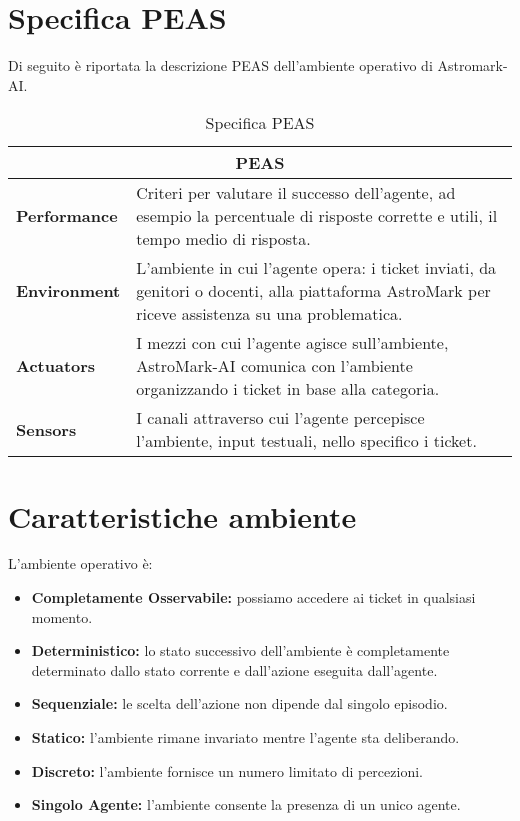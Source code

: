\section{Specifica PEAS}
Di seguito è riportata la descrizione PEAS dell'ambiente operativo di Astromark-AI.
\begin{table}[h]
\centering
\begin{tabular}{|p{4cm}|p{10cm}|}
\hline
\multicolumn{2}{|c|}{\textbf{PEAS}} \\
\hline
\textbf{Performance} & Criteri per valutare il successo dell'agente, ad esempio la percentuale di risposte corrette e utili, il tempo medio di risposta. \\
\hline
\textbf{Environment} & L'ambiente in cui l'agente opera: i ticket inviati, da genitori o docenti, alla piattaforma AstroMark per riceve assistenza su una problematica. \\
\hline
\textbf{Actuators} & I mezzi con cui l'agente agisce sull'ambiente, AstroMark-AI comunica con l'ambiente organizzando i ticket in base alla categoria. \\
\hline
\textbf{Sensors} & I canali attraverso cui l'agente percepisce l'ambiente, input testuali, nello specifico i ticket. \\
\hline
\end{tabular}
\caption{Specifica PEAS}
\label{tab:peas}
\end{table}

\FloatBarrier

\section{Caratteristiche ambiente}
L'ambiente operativo è:
\begin{itemize}
    \item \textbf{Completamente Osservabile: }possiamo accedere ai ticket in qualsiasi momento.
    \item \textbf{Deterministico: }lo stato successivo dell’ambiente è completamente determinato dallo stato corrente e dall’azione eseguita dall’agente.
    \item \textbf{Sequenziale: }le scelta dell'azione non dipende dal singolo episodio.
    \item \textbf{Statico: }l'ambiente rimane invariato mentre l'agente sta deliberando.
    \item \textbf{Discreto: }l'ambiente fornisce un numero limitato di percezioni.
    \item \textbf{Singolo Agente: }l'ambiente consente la presenza di un unico agente.
\end{itemize}
